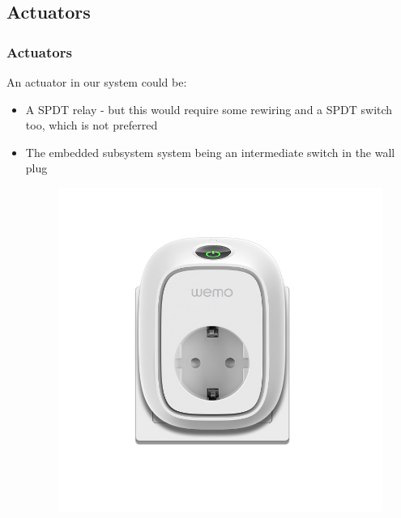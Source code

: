\subsection{Actuators}
\begin{frame}
	\frametitle{Actuators}
	An actuator in our system could be:
	\begin{itemize}
		\item A SPDT relay - but this would require some rewiring and a SPDT switch too, which is not preferred
		\item The embedded subsystem system being an intermediate switch in the wall plug
		\begin{figure}[htbp]
		    \centering
        \includegraphics[width=\textwidth/2]{Images/wemo.jpeg}
		\end{figure}
	\end{itemize}
\end{frame}
